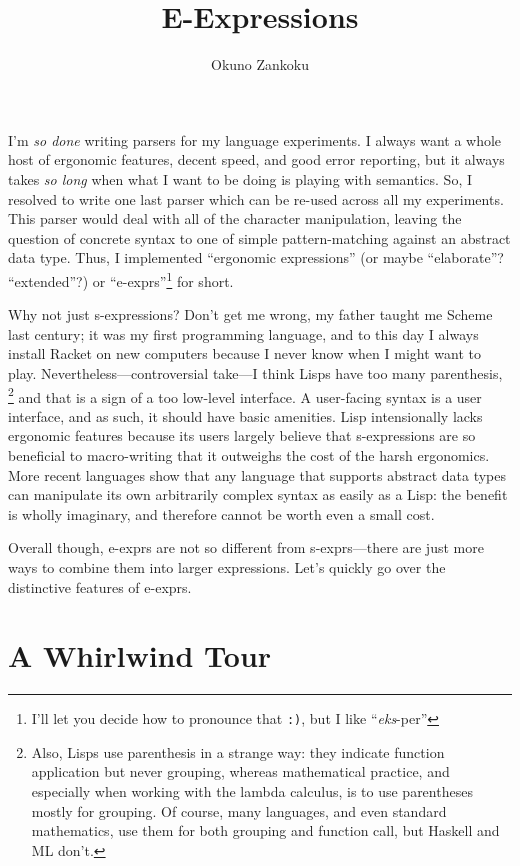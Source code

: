 \documentclass[11pt]{article} %
\title{E-Expressions}
\author{Okuno Zankoku}
\begin{document}
\maketitle

I'm \emph{so done} writing parsers for my language experiments.
I always want a whole host of ergonomic features, decent speed, and good error reporting, but it always takes \emph{so long} when what I want to be doing is playing with semantics.
So, I resolved to write one last parser which can be re-used across all my experiments.
This parser would deal with all of the character manipulation, leaving the question of concrete syntax to one of simple pattern-matching against an abstract data type.
Thus, I implemented ``ergonomic expressions'' (or maybe ``elaborate''? ``extended''?) or ``e-exprs''\footnote{I'll let you decide how to pronounce that \texttt{:)}, but I like ``\emph{eks}-per''} for short.

{
  Why not just s-expressions?
  Don't get me wrong, my father taught me Scheme last century; it was my first programming language, and to this day I always install Racket on new computers because I never know when I might want to play.
  Nevertheless---controversial take---I think Lisps have too many parenthesis,%
    \footnote{Also, Lisps use parenthesis in a strange way: they indicate function application but never grouping, whereas mathematical practice, and especially when working with the lambda calculus, is to use parentheses mostly for grouping.
    Of course, many languages, and even standard mathematics, use them for both grouping and function call, but Haskell and ML don't.
    }
    and that is a sign of a too low-level interface.
  A user-facing syntax is a user interface, and as such, it should have basic amenities.
  Lisp intensionally lacks ergonomic features because its users largely believe that s-expressions are so beneficial to macro-writing that it outweighs the cost of the harsh ergonomics.
  More recent languages show that any language that supports abstract data types can manipulate its own arbitrarily complex syntax as easily as a Lisp: the benefit is wholly imaginary, and therefore cannot be worth even a small cost.
}

Overall though, e-exprs are not so different from s-exprs---there are just more ways to combine them into larger expressions.
Let's quickly go over the distinctive features of e-exprs.

\section{A Whirlwind Tour}
\end{document}
